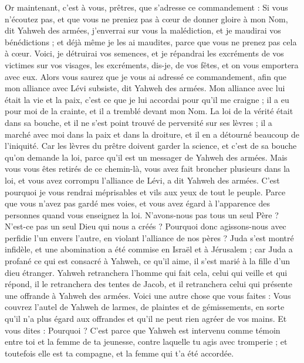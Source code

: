 \begin{multicols}{2}
\VerseOne{}Or maintenant, c'est à vous, prêtres, que s'adresse ce commandement :
Si vous n'écoutez pas, et que vous ne preniez pas à cœur de donner gloire à mon Nom, dit Yahweh des armées, j'enverrai sur vous la malédiction, et je maudirai vos bénédictions ; et déjà même je les ai maudites, parce que vous ne prenez pas cela à cœur.
Voici, je détruirai vos semences, et je répandrai les excréments de vos victimes sur vos visages, les excréments, dis-je, de vos fêtes, et on vous emportera avec eux.
Alors vous saurez que je vous ai adressé ce commandement, afin que mon alliance avec Lévi subsiste, dit Yahweh des armées.
Mon alliance avec lui était la vie et la paix, c'est ce que je lui accordai pour qu'il me craigne ; il a eu pour moi de la crainte, et il a tremblé devant mon Nom.
La loi de la vérité était dans sa bouche, et il ne s'est point trouvé de perversité sur ses lèvres ; il a marché avec moi dans la paix et dans la droiture, et il en a détourné beaucoup de l'iniquité.
Car les lèvres du prêtre doivent garder la science, et c'est de sa bouche qu'on demande la loi, parce qu'il est un messager de Yahweh des armées.
Mais vous vous êtes retirés de ce chemin-là, vous avez fait broncher plusieurs dans la loi, et vous avez corrompu l'alliance de Lévi, a dit Yahweh des armées.
C'est pourquoi je vous rendrai méprisables et vils aux yeux de tout le peuple. Parce que vous n'avez pas gardé mes voies, et vous avez égard à l'apparence des personnes quand vous enseignez la loi.
N'avons-nous pas tous un seul Père ? N'est-ce pas un seul Dieu qui nous a créés ? Pourquoi donc agissons-nous avec perfidie l'un envers l'autre, en violant l'alliance de nos pères ?
Juda s'est montré infidèle, et une abomination a été commise en Israël et à Jérusalem ; car Juda a profané ce qui est consacré à Yahweh, ce qu'il aime, il s'est marié à la fille d'un dieu étranger.
Yahweh retranchera l'homme qui fait cela, celui qui veille et qui répond, il le retranchera des tentes de Jacob, et il retranchera celui qui présente une offrande à Yahweh des armées.
Voici une autre chose que vous faites : Vous couvrez l'autel de Yahweh de larmes, de plaintes et de gémissements, en sorte qu'il n'a plus égard aux offrandes et qu'il ne peut rien agréer de vos mains.
Et vous dites : Pourquoi ? C'est parce que Yahweh est intervenu comme témoin entre toi et la femme de ta jeunesse, contre laquelle tu agis avec tromperie ; et toutefois elle est ta compagne, et la femme qui t'a été accordée.

\end{multicols}
